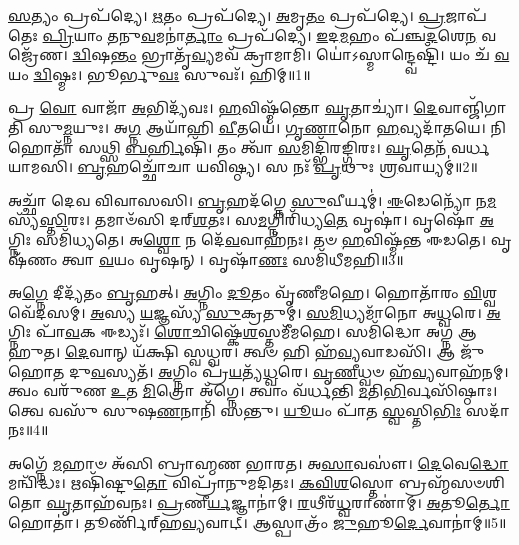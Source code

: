 \setcounter{anuvakam}{0}

\-\ul{𑌸}\-𑌤𑍍𑌯𑌂 𑌪𑍍𑌰𑌪᳴𑌦𑍍𑌯𑍇।
\-\ul{𑌋}\-𑌤𑌂 𑌪𑍍𑌰𑌪᳴𑌦𑍍𑌯𑍇।
\-\ul{𑌅}\-𑌮𑍃\-\ul{𑌤𑌂} 𑌪𑍍𑌰𑌪᳴𑌦𑍍𑌯𑍇।
\-\ul{𑌪𑍍𑌰}\-𑌜𑌾𑌪᳴𑌤𑍇𑌃 \ul{𑌪𑍍𑌰𑌿}\-𑌯𑌾𑌂 \ul{𑌤}\-𑌨𑍁\-\ul{𑌵}\-𑌮𑌨𑌾॑\-\ul{𑌰𑍍𑌤𑌾𑌂} 𑌪𑍍𑌰𑌪᳴𑌦𑍍𑌯𑍇।
\-\ul{𑌇}\-𑌦\-\ul{𑌮}\-𑌹𑌂 𑌪᳴𑌞𑍍𑌚\-\ul{𑌦}\-𑌶𑍇\-\ul{𑌨} 𑌵𑌜𑍍𑌰𑍇᳴𑌣।
\-\ul{𑌦𑍍𑌵𑌿}\-𑌷\-\ul{𑌨𑍍𑌤𑌂} 𑌭𑍍𑌰𑌾𑌤𑍃᳴\-\ul{𑌵𑍍𑌯}\-𑌮𑌵᳴ 𑌕𑍍𑌰𑌾𑌮𑌾𑌮𑌿।
𑌯𑍋॑𑌽𑌸𑍍𑌮𑌾𑌨𑍍𑌦𑍍𑌵𑍇𑌷𑍍𑌟𑌿᳴।
𑌯𑌂 𑌚᳴ \ul{𑌵}\-𑌯𑌂 \ul{𑌦𑍍𑌵𑌿}\-𑌷𑍍𑌮𑌃।
𑌭𑍂𑌰𑍍𑌭𑍁\-\ul{𑌵𑌃} 𑌸𑍁𑌵𑌃᳴।
𑌹𑌿𑌮𑍍॥1॥\anuvakamend[\-\ul{𑌸}\-𑌤𑍍𑌯𑌂 𑌦𑌶᳴]

𑌪𑍍𑌰 \ul{𑌵𑍋} 𑌵𑌾𑌜𑌾᳴ \ul{𑌅}\-𑌭𑌿𑌦𑍍𑌯᳴𑌵𑌃।
\-\ul{𑌹}\-𑌵𑌿𑌷𑍍𑌮᳴𑌨𑍍𑌤𑍋 \ul{𑌘𑍃}\-𑌤𑌾𑌚𑍍𑌯𑌾॑।
\-\ul{𑌦𑍇}\-𑌵𑌾𑌞𑍍𑌜𑌿᳴𑌗𑌾𑌤𑌿 𑌸𑍁\-\ul{𑌮𑍍𑌨}\-𑌯𑍁𑌃।
𑌅\-\ul{𑌗𑍍𑌨} 𑌆𑌯𑌾᳴𑌹𑌿 \ul{𑌵𑍀}\-𑌤𑌯𑍇॑।
\-\ul{𑌗𑍃}\-\-\ul{𑌣𑌾}\-𑌨𑍋 \ul{𑌹}\-𑌵𑍍𑌯𑌦𑌾᳴𑌤𑌯𑍇।
𑌨𑌿 𑌹𑍋𑌤𑌾᳴ 𑌸𑌥𑍍𑌸𑌿 \ul{𑌬}\-\-\ul{𑌰𑍍}\-𑌹𑌿𑌷𑌿᳴।
𑌤𑌂 𑌤𑍍𑌵𑌾᳴ \ul{𑌸}\-𑌮𑌿𑌦𑍍𑌭𑌿᳴𑌰𑌙𑍍𑌗𑌿𑌰𑌃।
\-\ul{𑌘𑍃}\-𑌤𑍇𑌨᳴ 𑌵𑌰𑍍𑌧𑌯𑌾𑌮𑌸𑌿।
\-\ul{𑌬𑍃}\-𑌹𑌚𑍍𑌛𑍋᳴𑌚𑌾 𑌯𑌵𑌿𑌷𑍍𑌠𑍍𑌯।
𑌸 𑌨𑌃᳴ \ul{𑌪𑍃}\-𑌥𑍁𑌃 \ul{𑌶𑍍𑌰}\-𑌵𑌾𑌯𑍍𑌯𑌮𑍍॑॥2॥

𑌅𑌚𑍍𑌛𑌾᳴ 𑌦𑍇𑌵 𑌵𑌿𑌵𑌾𑌸𑌸𑌿।
\-\ul{𑌬𑍃}\-𑌹𑌦᳴𑌗𑍍𑌨𑍇 \ul{𑌸𑍁}\-𑌵𑍀𑌰𑍍𑌯𑌮𑍍॑।
\-\ul{𑌈}\-𑌡𑍇𑌨𑍍𑌯𑍋᳴ 𑌨\-\ul{𑌮}\-𑌸𑍍𑌯᳴\-\ul{𑌸𑍍𑌤𑌿}\-𑌰𑌃।
𑌤𑌮𑌾𑍞᳴𑌸𑌿 𑌦𑌰𑍍‌\mbox{}\-\ul{𑌶}\-𑌤𑌃।
𑌸\-\ul{𑌮}\-𑌗𑍍𑌨𑌿𑌰𑌿᳴𑌧𑍍𑌯\-\ul{𑌤𑍇} 𑌵𑍃𑌷𑌾॑।
𑌵𑍃𑌷𑍋᳴ \ul{𑌅}\-𑌗𑍍𑌨𑌿𑌃 𑌸𑌮𑌿᳴𑌧𑍍𑌯𑌤𑍇।
𑌅\-\ul{𑌶𑍍𑌵𑍋} 𑌨 𑌦𑍇᳴\-\ul{𑌵}\-𑌵𑌾𑌹᳴𑌨𑌃।
𑌤𑍞 \ul{𑌹}\-𑌵𑌿𑌷𑍍𑌮᳴𑌨𑍍𑌤 𑌈𑌡𑌤𑍇।
𑌵𑍃𑌷᳴𑌣𑌂 𑌤𑍍𑌵𑌾 \ul{𑌵}\-𑌯𑌂 𑌵𑍃𑌷𑌨𑍍।
𑌵𑍃𑌷𑌾᳴\-\ul{𑌣𑌃} 𑌸𑌮𑌿᳴𑌧𑍀𑌮𑌹𑌿॥3॥

𑌅\-\ul{𑌗𑍍𑌨𑍇} 𑌦𑍀𑌦𑍍𑌯᳴𑌤𑌂 \ul{𑌬𑍃}\-𑌹𑌤𑍍।
\-\ul{𑌅}\-𑌗𑍍𑌨𑌿𑌂 \ul{𑌦𑍂}\-𑌤𑌂 𑌵𑍃᳴𑌣𑍀𑌮𑌹𑍇।
𑌹𑍋𑌤𑌾᳴𑌰𑌂 \ul{𑌵𑌿}\-𑌶𑍍𑌵𑌵𑍇᳴𑌦𑌸𑌮𑍍।
\-\ul{𑌅}\-𑌸𑍍𑌯 \ul{𑌯}\-𑌜𑍍𑌞𑌸𑍍𑌯᳴ \ul{𑌸𑍁}\-𑌕𑍍𑌰𑌤𑍁𑌮𑍍॑।
\-\ul{𑌸}\-\-\ul{𑌮𑌿}\-𑌧𑍍𑌯𑌮𑌾᳴𑌨𑍋 𑌅\-\ul{𑌧𑍍𑌵}\-𑌰𑍇।
\-\ul{𑌅}\-𑌗𑍍𑌨𑌿𑌃 𑌪𑌾᳴\-\ul{𑌵}\-𑌕 𑌈𑌡𑍍𑌯𑌃᳴।
\-\ul{𑌶𑍋}\-𑌚𑌿𑌷𑍍𑌕𑍇᳴\-\ul{𑌶}\-𑌸𑍍𑌤𑌮𑍀᳴𑌮𑌹𑍇।
𑌸𑌮𑌿᳴𑌦𑍍𑌧𑍋 𑌅𑌗𑍍𑌨 𑌆𑌹𑍁𑌤।
\-\ul{𑌦𑍇}\-𑌵𑌾𑌨𑍍 𑌯᳴𑌕𑍍𑌷𑌿 𑌸𑍍𑌵𑌧𑍍𑌵𑌰।
𑌤𑍍𑌵𑍞 𑌹𑌿 𑌹᳴\-\ul{𑌵𑍍𑌯}\-𑌵𑌾𑌡𑌸𑌿᳴।
𑌆 𑌜𑍁᳴𑌹𑍋𑌤 𑌦𑍁\-\ul{𑌵}\-𑌸𑍍𑌯𑌤᳴।
\-\ul{𑌅}\-𑌗𑍍𑌨𑌿𑌂 𑌪𑍍𑌰᳴\-\ul{𑌯}\-𑌤𑍍𑌯᳴\-\ul{𑌧𑍍𑌵}\-𑌰𑍇।
\-\ul{𑌵𑍃}\-\-\ul{𑌣𑍀}\-𑌧𑍍𑌵𑍞 𑌹᳴\-\ul{𑌵𑍍𑌯}\-𑌵𑌾𑌹᳴𑌨𑌮𑍍।
𑌤𑍍𑌵𑌂 𑌵𑌰𑍁᳴𑌣 \ul{𑌉}\-𑌤 \ul{𑌮𑌿}\-𑌤𑍍𑌰𑍋 𑌅᳴𑌗𑍍𑌨𑍇।
𑌤𑍍𑌵𑌾𑌂 𑌵᳴𑌰𑍍𑌧𑌨𑍍𑌤𑌿 \ul{𑌮}\-𑌤𑌿\-\ul{𑌭𑌿}\-𑌰𑍍𑌵𑌸𑌿᳴𑌷𑍍𑌠𑌾𑌃।
𑌤𑍍𑌵𑍇 𑌵𑌸𑍁᳴ 𑌸𑍁𑌷\-\ul{𑌣}\-𑌨𑌾𑌨𑌿᳴ 𑌸𑌨𑍍𑌤𑍁।
\-\ul{𑌯𑍂}\-𑌯𑌂 𑌪𑌾᳴𑌤 \ul{𑌸𑍍𑌵}\-𑌸𑍍𑌤𑌿\-\ul{𑌭𑌿𑌃} 𑌸𑌦𑌾᳴ 𑌨𑌃॥4॥\anuvakamend[\-\ul{𑌶𑍍𑌰}\-𑌵𑌾𑌯𑍍𑌯᳴𑌮𑌿𑌧𑍀\-\ul{𑌮}\-𑌹𑍍𑌯𑌸𑌿᳴ \ul{𑌸}\-𑌪𑍍𑌤 𑌚᳴]

𑌅𑌗𑍍𑌨𑍇᳴ \ul{𑌮}\-𑌹𑌾𑍞 𑌅᳴𑌸𑌿 𑌬𑍍𑌰𑌾𑌹𑍍𑌮𑌣 𑌭𑌾𑌰𑌤।
𑌅\-\ul{𑌸𑌾}\-𑌵𑌸𑍗॑।
\-\ul{𑌦𑍇}\-𑌵𑍇\-\ul{𑌦𑍍𑌧𑍋} 𑌮𑌨𑍍𑌵𑌿᳴𑌦𑍍𑌧𑌃।
𑌋𑌷𑌿᳴𑌷𑍍𑌟𑍁\-\ul{𑌤𑍋} 𑌵𑌿𑌪𑍍𑌰𑌾᳴𑌨𑍁𑌮𑌦𑌿𑌤𑌃।
\-\ul{𑌕}\-\-\ul{𑌵𑌿}\-\-\ul{𑌶}\-𑌸𑍍𑌤𑍋 𑌬𑍍𑌰𑌹𑍍𑌮᳴𑌸𑍞𑌶𑌿𑌤𑍋 \ul{𑌘𑍃}\-𑌤𑌾𑌹᳴𑌵𑌨𑌃।
\-\ul{𑌪𑍍𑌰}\-𑌣𑍀\-\ul{𑌰𑍍𑌯}\-𑌜𑍍𑌞𑌾𑌨𑌾॑𑌮𑍍।
\-\ul{𑌰}\-𑌥𑍀𑌰᳴\-\ul{𑌧𑍍𑌵}\-𑌰𑌾𑌣𑌾॑𑌮𑍍।
\-\ul{𑌅}\-𑌤𑍂\-\ul{𑌰𑍍𑌤𑍋} 𑌹𑍋𑌤𑌾॑।
𑌤𑍂𑌰𑍍𑌣𑌿᳴𑌰𑍍‌\mbox{}𑌹\-\ul{𑌵𑍍𑌯}\-𑌵𑌾𑌟𑍍।
𑌆𑌸𑍍𑌪𑌾𑌤𑍍𑌰𑌂᳴ \ul{𑌜𑍁}\-𑌹𑍂\-\ul{𑌰𑍍𑌦𑍇}\-𑌵𑌾𑌨𑌾॑𑌮𑍍॥5॥

